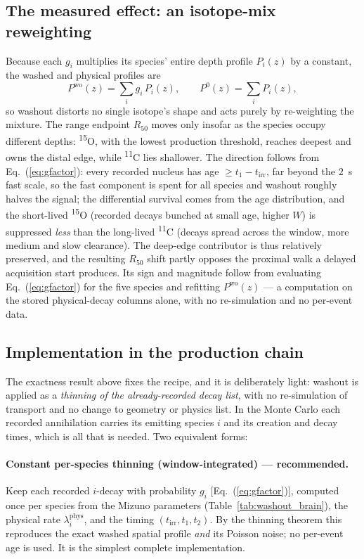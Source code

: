 \documentclass[11pt]{article}
\newcommand{\iso}[2]{\textsuperscript{#1}#2}
\begin{document}
\subsection*{The measured effect: an isotope-mix reweighting}

Because each $g_i$ multiplies its species' entire depth profile $P_i(z)$ by a
constant, the washed and physical profiles are
%
\begin{equation}
  P^{\mathrm{wo}}(z) = \sum_i g_i\,P_i(z),
  \qquad
  P^{0}(z) = \sum_i P_i(z),
  \label{eq:mix}
\end{equation}
%
so washout distorts no single isotope's shape and acts purely by re-weighting
the mixture. The range endpoint $R_{50}$ moves only insofar as the species
occupy different depths: \iso{15}{O}, with the lowest production threshold,
reaches deepest and owns the distal edge, while \iso{11}{C} lies shallower. The
direction follows from Eq.~(\ref{eq:gfactor}): every recorded nucleus has age
$\ge t_1-t_{\mathrm{irr}}$, far beyond the $2$~s fast scale, so the fast
component is spent for all species and washout roughly halves the signal; the
differential survival comes from the age distribution, and the short-lived
\iso{15}{O} (recorded decays bunched at small age, higher $W$) is suppressed
\emph{less} than the long-lived \iso{11}{C} (decays spread across the window,
more medium and slow clearance). The deep-edge contributor is thus relatively
preserved, and the resulting $R_{50}$ shift partly opposes the proximal walk a
delayed acquisition start produces. Its sign and magnitude follow from
evaluating Eq.~(\ref{eq:gfactor}) for the five species and refitting
$P^{\mathrm{wo}}(z)$ --- a computation on the stored physical-decay columns
alone, with no re-simulation and no per-event data.

\subsection*{Implementation in the production chain}

The exactness result above fixes the recipe, and it is deliberately light: washout
is applied as a \emph{thinning of the already-recorded decay list}, with no
re-simulation of transport and no change to geometry or physics list. In the Monte
Carlo each recorded annihilation carries its emitting species $i$ and its creation
and decay times, which is all that is needed. Two equivalent forms:

\paragraph{Constant per-species thinning (window-integrated) --- recommended.}
Keep each recorded $i$-decay with probability $g_i$ [Eq.~(\ref{eq:gfactor})],
computed once per species from the Mizuno parameters (Table~\ref{tab:washout_brain}),
the physical rate $\lambda_i^{\mathrm{phys}}$, and the timing
$(t_{\mathrm{irr}},t_1,t_2)$. By the thinning theorem this reproduces the exact
washed spatial profile \emph{and} its Poisson noise; no per-event age is used. It
is the simplest complete implementation.
\end{document}
